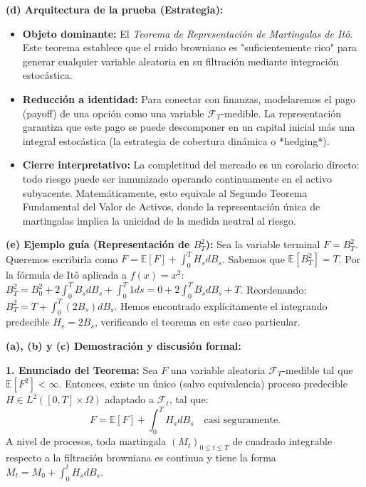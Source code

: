 \documentclass[11pt, letterpaper]{article}
\begin{document}
\begin{solucion}
    \textbf{(d) Arquitectura de la prueba (Estrategia):}
    \begin{itemize}
        \item[(i)] \textbf{Objeto dominante:} El \textit{Teorema de Representación de Martingalas de Itô}. Este teorema establece que el ruido browniano es "suficientemente rico" para generar cualquier variable aleatoria en su filtración mediante integración estocástica.
        \item[(ii)] \textbf{Reducción a identidad:} Para conectar con finanzas, modelaremos el pago (payoff) de una opción como una variable $\mathcal{F}_T$-medible. La representación garantiza que este pago se puede descomponer en un capital inicial más una integral estocástica (la estrategia de cobertura dinámica o *hedging*).
        \item[(iii)] \textbf{Cierre interpretativo:} La completitud del mercado es un corolario directo: todo riesgo puede ser inmunizado operando continuamente en el activo subyacente. Matemáticamente, esto equivale al Segundo Teorema Fundamental del Valor de Activos, donde la representación única de martingalas implica la unicidad de la medida neutral al riesgo.
    \end{itemize}

    \vspace{3mm}
    \textbf{(e) Ejemplo guía (Representación de $B_T^2$):}
    Sea la variable terminal $F = B_T^2$. Queremos escribirla como $F = \mathbb{E}[F] + \int_0^T H_s dB_s$.
    Sabemos que $\mathbb{E}[B_T^2] = T$.
    Por la fórmula de Itô aplicada a $f(x)=x^2$: $B_T^2 = B_0^2 + 2 \int_0^T B_s dB_s + \int_0^T 1 ds = 0 + 2 \int_0^T B_s dB_s + T$.
    Reordenando: $B_T^2 = T + \int_0^T (2 B_s) dB_s$.
    Hemos encontrado explícitamente el integrando predecible $H_s = 2 B_s$, verificando el teorema en este caso particular.

    \textbf{(a), (b) y (c) Demostración y discusión formal:}

    \textbf{1. Enunciado del Teorema:}
    Sea $F$ una variable aleatoria $\mathcal{F}_T$-medible tal que $\mathbb{E}[F^2] < \infty$. Entonces, existe un único (salvo equivalencia) proceso predecible $H \in L^2([0,T] \times \Omega)$ adaptado a $\mathcal{F}_t$, tal que:
    \[ F = \mathbb{E}[F] + \int_0^T H_s dB_s \quad \text{casi seguramente.} \]
    A nivel de procesos, toda martingala $(M_t)_{0 \le t \le T}$ de cuadrado integrable respecto a la filtración browniana es continua y tiene la forma $M_t = M_0 + \int_0^t H_s dB_s$.


\end{solucion}
\end{document}
